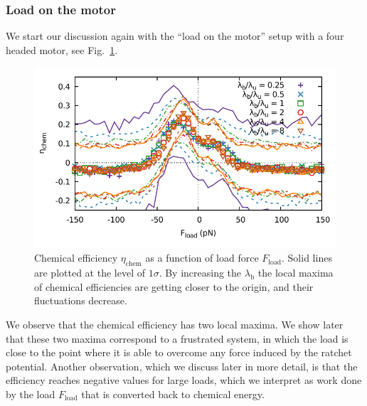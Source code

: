 \documentclass[aps,pre,twocolumn,showpacs,showkeys,superscriptaddress,floatfix]{revtex4-1}
\begin{document}
\subsubsection{Load on the motor}
We start our discussion again with the ``load on the motor'' setup with a four headed motor, see Fig.~\ref{fig:chem}.
\begin{figure}[t]
\centering
\includegraphics[width=0.9\linewidth,height=!]{chemical_cycle}
\caption{
\label{fig:chem}
Chemical efficiency $\eta_\text{chem}$ as a function of load force $F_\text{load}$.
Solid lines are plotted at the level of $1\sigma$. 
By increasing the $\lambda_\text{b}$ the local maxima of chemical efficiencies are getting closer to the origin,
and their fluctuations decrease. 
}
\end{figure}
We observe that the chemical efficiency has two local maxima. 
We show later that these two maxima correspond to a frustrated system, 
in which the load is close to the point where it is able to overcome any force induced by the ratchet potential. 
Another observation, which we discuss later in more detail, is that the efficiency reaches negative values for large loads, 
which we interpret as work done by the load $F_\text{load}$ that is converted back to chemical energy. 
\end{document}
